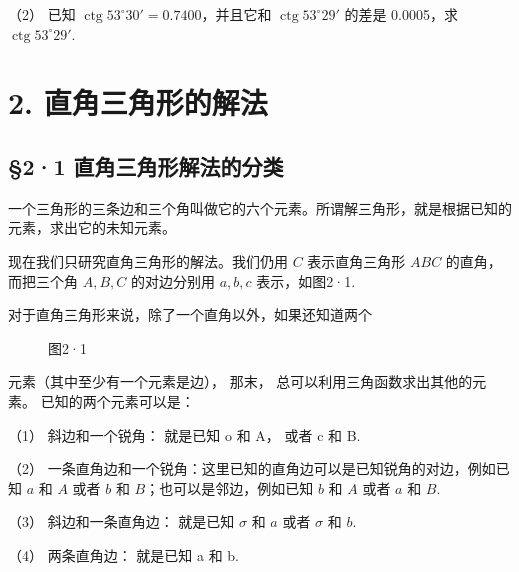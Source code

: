 （2） 已知 \(\operatorname{ctg} 53^{\circ}30' = 0.7400\)，并且它和
\(\operatorname{ctg} 53^{\circ}29'\) 的差是 0.0005，求
\(\operatorname{ctg} 53^{\circ}29'\).

\chapter{2. 直角三角形的解法}

\section{§2·1 直角三角形解法的分类}

一个三角形的三条边和三个角叫做它的六个元素。所谓解三角形，就是根据已知的元素，求出它的未知元素。

现在我们只研究直角三角形的解法。我们仍用 \(C\) 表示直角三角形 \(ABC\)
的直角，而把三个角 \(A, B, C\) 的对边分别用 \(a,b,c\) 表示，如图2·1.

对于直角三角形来说，除了一个直角以外，如果还知道两个

\begin{figure}
\centering
{}
\caption{图2·1}
\end{figure}


元素（其中至少有一个元素是边）， 那末，
总可以利用三角函数求出其他的元素。 已知的两个元素可以是：

（1） 斜边和一个锐角： 就是已知 o 和 A， 或者 c 和 B.

（2）
一条直角边和一个锐角：这里已知的直角边可以是已知锐角的对边，例如已知
\(a\) 和 \(A\) 或者 \(b\) 和 \(B\)；也可以是邻边，例如已知 \(b\) 和
\(A\) 或者 \(a\) 和 \(B\).

（3） 斜边和一条直角边： 就是已知 \(\sigma\) 和 \(a\) 或者 \(\sigma\) 和
\(b\).

（4） 两条直角边： 就是已知 a 和 b.

